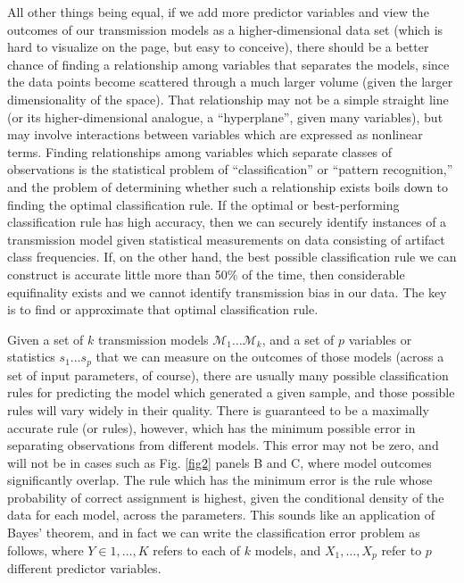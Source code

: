 \documentclass[10pt,letterpaper]{article}
\begin{document}
All other things being equal, if we add more predictor variables and view the outcomes of our transmission models as a higher-dimensional data set (which is hard to visualize on the page, but easy to conceive), there should be a better chance of finding a relationship among variables that separates the models, since the data points become scattered through a much larger volume (given the larger dimensionality of the space).   That relationship may not be a simple straight line (or its higher-dimensional analogue, a ``hyperplane'', given many variables), but may involve interactions between variables which are expressed as nonlinear terms.  Finding  relationships among variables which separate classes of observations is the statistical problem of ``classification'' or ``pattern recognition,'' and the problem of determining whether such a relationship exists boils down to finding the optimal classification rule.  If the optimal or best-performing classification rule has high accuracy, then we can securely identify instances of a transmission model given statistical measurements on data consisting of artifact class frequencies.  If, on the other hand, the best possible classification rule we can construct is accurate little more than 50\% of the time, then considerable equifinality exists and we cannot identify transmission bias in our data.  The key is to find or approximate that optimal classification rule.

Given a set of $k$ transmission models \(\mathcal{M}_1 \ldots \mathcal{M}_k\), and a set of $p$ variables or statistics \(s_1 \ldots s_p\) that we can measure on the outcomes of those models (across a set of input parameters, of course), there are usually many possible classification rules for predicting the model which generated a given sample, and those possible rules will vary widely in their quality.  There is guaranteed to be a maximally accurate rule (or rules), however, which has the minimum possible error in separating observations from different models.  This error may not be zero, and will not be in cases such as Fig. \ref{fig2} panels B and C, where model outcomes significantly overlap.  The rule which has the minimum error is the rule whose probability of correct assignment is highest, given the conditional density of the data for each model, across the parameters.  This sounds like an application of Bayes' theorem, and in fact we can write the classification error problem as follows, where
\(Y \in 1, \ldots, K\) refers to each of \(k\) models, and
\(X_1, \ldots, X_p\) refer to \(p\) different predictor variables.
\end{document}
